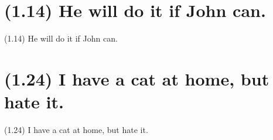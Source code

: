 \documentclass{article}
\begin{document}
\section*{(1.14) He will do it if John can.}

\bigbreak
\begin{enumerate*}
\item[(1.14)] He will do it if John can.
\end{enumerate*}
\bigbreak

\bigbreak
\begin{minipage}{\textwidth}
\end{minipage}
\bigbreak

\bigbreak
\begin{minipage}{\textwidth}
\end{minipage}
\bigbreak

\clearpage

%
%

\section*{(1.24) I have a cat at home, but hate it.}

\bigbreak
\begin{enumerate*}
\item[(1.24)] I have a cat at home, but hate it.
\end{enumerate*}
\bigbreak
\end{document}
